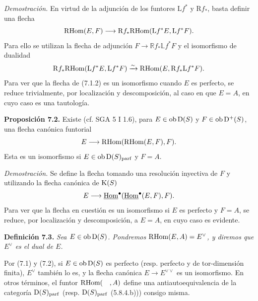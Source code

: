 \emph{Demostración.} En virtud de la adjunción de los funtores \(\mathrm Lf^*\) y \(\mathrm Rf_*\), basta definir una flecha
\[
  \mathrm R\!\operatorname{Hom}(E,F)
  \longrightarrow
  \mathrm Rf_*\mathrm R\!\operatorname{Hom}(\mathrm Lf^*E,\mathrm Lf^*F).
\]
Para ello se utilizan la flecha de adjunción \(F\to\mathbb Rf_*\mathbb Lf^*F\) y el isomorfismo de dualidad
\[
  \mathrm Rf_*\mathrm R\!\operatorname{Hom}(\mathrm Lf^*E,\mathrm Lf^*F)
  \xrightarrow{\sim}
  \mathrm R\!\operatorname{Hom}(E,\mathrm Rf_*\mathrm Lf^*F).
\]
Para ver que la flecha de (7.1.2) es un isomorfismo cuando \(E\) es perfecto, se reduce trivialmente, por localización y descomposición, al caso en que \(E=A\), en cuyo caso es una tautología.

\textbf{Proposición 7.2.} Existe (cf. SGA 5 I 1.6), para \(E\in\operatorname{ob}\mathrm D(S)\) y \(F\in\operatorname{ob}\mathrm D^+(S)\), una flecha canónica funtorial
\[
  E\longrightarrow\mathrm R\!\operatorname{Hom}(\mathrm R\!\operatorname{Hom}(E,F),F).
\]
Esta es un isomorfismo si \(E\in\operatorname{ob}\mathrm D(S)_{\mathrm{parf}}\) y \(F=A\).

\emph{Demostración.} Se define la flecha tomando una resolución inyectiva de \(F\) y utilizando la flecha canónica de \(\mathrm K(S)\)
\[
  E\longrightarrow\underline{\operatorname{Hom}}^\bullet(\underline{\operatorname{Hom}}^\bullet(E,F),F).
\]
Para ver que la flecha en cuestión es un isomorfismo si \(E\) es perfecto y \(F=A\), se reduce, por localización y descomposición, a \(E=A\), en cuyo caso es evidente.

\textbf{Definición 7.3.} \emph{Sea \(E\in\operatorname{ob}\mathrm D(S)\). Pondremos \(\mathrm R\!\operatorname{Hom}(E,A)=E^\vee\), y diremos que \(E^\vee\) es el dual de \(E\).}

Por (7.1) y (7.2), si \(E\in\operatorname{ob}\mathrm D(S)\) es perfecto (resp. perfecto y de tor-dimensión finita), \(E^\vee\) también lo es, y la flecha canónica \(E\to E^{\vee\vee}\) es un isomorfismo. En otros términos, el funtor \(\mathrm R\!\operatorname{Hom}(\quad,A)\) define una antiautoequivalencia de la categoría \(\mathrm D(S)_{\mathrm{parf}}\) (resp. \(\mathrm D(S)_{\operatorname{parf}}\) (5.8.4.b))) consigo misma.
